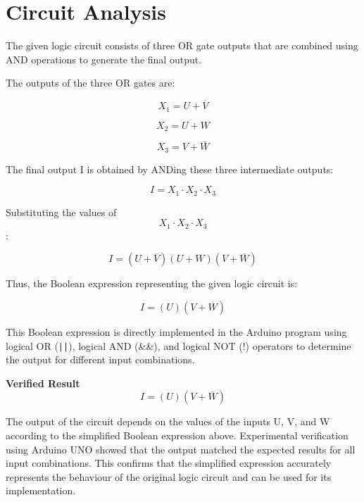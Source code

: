 \documentclass[12pt,a4paper]{article}
\begin{document}
\newpage
\section{Circuit Analysis}


\begin{tcolorbox}[stepbox]
The given logic circuit consists of three OR gate outputs that are combined using AND operations to generate the final output.

The outputs of the three OR gates are:

\[
X_1 = U + \overline{V}
\]

\[
X_2 = U + W
\]

\[
X_3 = V + \overline{W}
\]


The final output I is obtained by ANDing these three intermediate outputs:

\[
I = X_1 \cdot X_2 \cdot X_3
\]

Substituting the values of \[
 X_1 \cdot X_2 \cdot X_3
\]:

\[
I = (U + \overline{V})(U + W)(V + \overline{W})
\]

Thus, the Boolean expression representing the given logic circuit is:

\[
I = (U) (V + \overline{W})
\]

This Boolean expression is directly implemented in the Arduino program using logical OR (\texttt{||}), logical AND (\&\&), and logical NOT (!) operators to determine the output for different input combinations.
\end{tcolorbox}

\vspace{8pt}

\begin{tcolorbox}[resultbox]
\textbf{Verified Result}
\[
I = (U) (V + \overline{W})
\]

The output of the circuit depends on the values of the inputs U, V, and W according to the simplified Boolean expression above. Experimental verification using Arduino UNO showed that the output matched the expected results for all input combinations. This confirms that the simplified expression accurately represents the behaviour of the original logic circuit and can be used for its implementation.
\end{tcolorbox}
\end{document}
